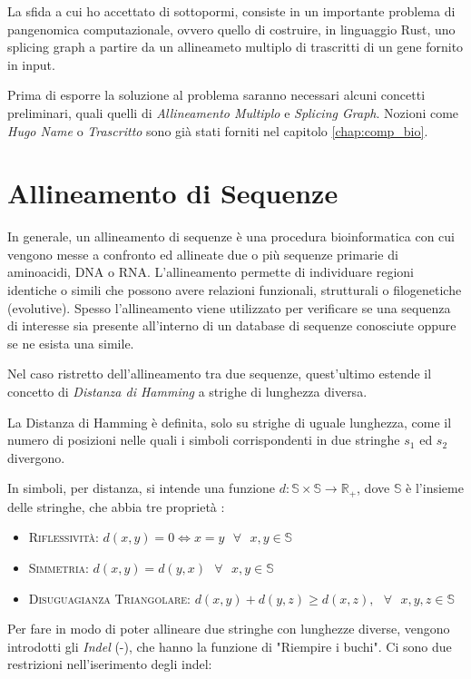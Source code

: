 La sfida a cui ho accettato di sottopormi, consiste in un importante problema di pangenomica computazionale, ovvero quello di costruire, in linguaggio Rust, uno splicing graph  a partire da un allineameto multiplo di trascritti di un gene fornito in input. 

Prima di esporre la soluzione al problema saranno necessari alcuni concetti preliminari, quali quelli di \textit{Allineamento Multiplo} e \textit{Splicing Graph}. Nozioni come \textit{Hugo Name} o \textit{Trascritto} sono già stati forniti nel capitolo \ref{chap:comp_bio}.

\section{Allineamento di Sequenze}
In generale, un allineamento di sequenze è una procedura bioinformatica con cui vengono messe a confronto ed allineate due o più sequenze primarie di aminoacidi, DNA o RNA. L'allineamento permette di individuare regioni identiche o simili che possono avere relazioni funzionali, strutturali o filogenetiche (evolutive). Spesso l'allineamento viene utilizzato per verificare se una sequenza di interesse sia presente all'interno di un database di sequenze conosciute oppure se ne esista una simile. 

Nel caso ristretto dell'allineamento tra due sequenze, quest'ultimo estende il concetto di \textit{Distanza di Hamming} a strighe di lunghezza diversa.

La Distanza di Hamming è definita, solo su strighe di uguale lunghezza, come il numero di posizioni nelle quali i simboli corrispondenti in due stringhe $s_1$ ed $s_2$ divergono. 

In simboli, per distanza, si intende una funzione $d: \mathbb{S}\times \mathbb{S} \to \mathbb{R_+}$, dove $\mathbb{S}$ è l'insieme delle stringhe, che abbia tre proprietà : 

\begin{itemize}
    \item \textsc{Riflessività:} $d(x,y)=0 \iff x=y \textrm{ } \forall \textrm{ } x,y \in \mathbb{S}$
    \item \textsc{Simmetria:} $d(x,y)=d(y,x) \textrm{ } \forall \textrm{ } x,y \in \mathbb{S}$
    \item \textsc{Disuguagianza Triangolare:} $d(x,y) +d(y,z)\geq d(x,z), \textrm{ } \forall \textrm{ } x,y,z \in \mathbb{S}$
\end{itemize}

Per fare in modo di poter allineare due stringhe con lunghezze diverse, vengono introdotti gli \textit{Indel} (-), che hanno la funzione di "Riempire i buchi". Ci sono due restrizioni nell'iserimento degli indel:

